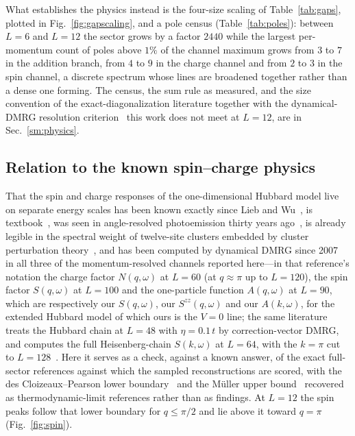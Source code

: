 What establishes the physics instead is the four-size scaling of Table~\ref{tab:gaps}, plotted in
Fig.~\ref{fig:gapscaling}, and a pole census (Table~\ref{tab:poles}): between $L=6$ and $L=12$ the
sector grows by a factor $2440$ while the largest per-momentum count of poles above $1\%$ of the channel
maximum grows from $3$ to $7$ in the addition branch, from $4$ to $9$ in the charge channel and from $2$
to $3$ in the spin channel, a discrete spectrum whose lines are broadened together rather than a dense
one forming. The census, the sum rule as measured, and the size convention of the
exact-diagonalization literature together with the dynamical-DMRG resolution
criterion~\cite{jeckelmann2002} this work does not meet at $L=12$, are in Sec.~\ref{sm:physics}.

\subsection{Relation to the known spin--charge physics}
\label{sec:physics:known}

That the spin and charge responses of the one-dimensional Hubbard model live on separate energy scales
has been known exactly since Lieb and Wu~\cite{liebwu1968}, is textbook~\cite{essler2005}, was seen in
angle-resolved photoemission thirty years ago~\cite{kim1996,damascelli2003}, is already legible in the
spectral weight of twelve-site clusters embedded by cluster perturbation theory~\cite{senechal2000},
and has been computed by dynamical DMRG since 2007~\cite{benthien2007} in all three of the
momentum-resolved channels reported here---in that reference's notation the charge factor
$N(q,\omega)$ at $L=60$ (at $q\approx\pi$ up to $L=120$), the spin factor $S(q,\omega)$ at $L=100$ and the one-particle function
$A(q,\omega)$ at $L=90$, which are respectively our $S(q,\omega)$, our $S^{zz}(q,\omega)$ and our
$A(k,\omega)$, for the extended Hubbard model of which ours is the $V=0$ line; the same literature treats the Hubbard chain at $L=48$ with $\eta=0.1\,t$ by
correction-vector DMRG, and computes the full Heisenberg-chain $S(k,\omega)$ at $L=64$, with the $k=\pi$ cut to $L=128$~\cite{nocera2016}. Here it serves as a check, against a known answer, of the exact full-sector references against which the sampled reconstructions are scored, with the des Cloizeaux--Pearson lower
boundary~\cite{descloizeaux1962} and the M\"uller upper bound~\cite{mueller1981} recovered as
thermodynamic-limit references rather than as findings. At $L=12$ the spin peaks follow that lower
boundary for $q\le\pi/2$ and lie above it toward $q=\pi$ (Fig.~\ref{fig:spin}).


